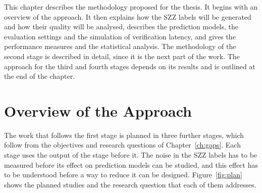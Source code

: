 \documentclass[12pt,a4paper,oneside]{report}
\begin{document}
This chapter describes the methodology proposed for the thesis. It begins
with an overview of the approach. It then explains how the SZZ labels will be
generated and how their quality will be analysed, describes the prediction
models, the evaluation settings and the simulation of verification latency,
and gives the performance measures and the statistical analysis. The
methodology of the second stage is described in detail, since it is the next
part of the work. The approach for the third and fourth stages depends on its
results and is outlined at the end of the chapter.

\section{Overview of the Approach}

The work that follows the first stage is planned in three further stages,
which follow from the objectives and research questions of
Chapter~\ref{ch:gaps}. Each stage uses the output of the stage before it. The
noise in the SZZ labels has to be measured before its effect on prediction
models can be studied, and this effect has to be understood before a way to
reduce it can be designed. Figure~\ref{fig:plan} shows the planned studies
and the research question that each of them addresses.
\end{document}
